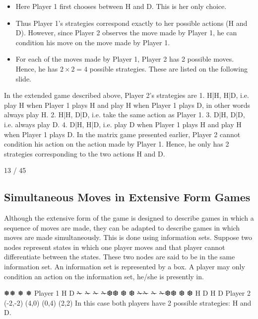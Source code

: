 \documentclass[]{report}
\begin{document}
\begin{itemize}
	\item Here Player 1 first chooses between H and D. This is her only
	choice. 
	\item Thus Player 1’s strategies correspond exactly to her
	possible actions (H and D).
	However, since Player 2 observes the move made by Player 1, he
	can condition his move on the move made by Player 1.
	\item For each of the moves made by Player 1, Player 2 has 2 possible
	moves. Hence, he has $2 \times 2 = 4$ possible strategies. These are
	listed on the following slide.
\end{itemize}


In the extended game described above, Player 2’s strategies are
1. H|H, H|D, i.e. play H when Player 1 plays H and
play H when Player 1 plays D, in other words always
play H.
2. H|H, D|D, i.e. take the same action as Player 1.
3. D|H, D|D, i.e. always play D.
4. D|H, H|D, i.e. play D when Player 1 plays H and
play H when Player 1 plays D.
In the matrix game presented earlier, Player 2 cannot condition his
action on the action made by Player 1. Hence, he only has 2
strategies corresponding to the two actions H and D.

13 / 45
\subsection{Simultaneous Moves in Extensive Form Games}
Although the extensive form of the game is designed to describe
games in which a sequence of moves are made, they can be
adapted to describe games in which moves are made
simultaneously.
This is done using information sets. Suppose two nodes represent
states in which one player moves and that player cannot
differentiate between the states.
These two nodes are said to be in the same information set. An
information set is represented by a box.
A player may only condition an action on the information set,
he/she is presently in.




❅❅
❅
❅
Player 1
H D
✁
✁
✁
✁❆❆
❆
❆ ✁✁
✁
✁❆❆
❆
❆
H D H D
Player 2
(-2,-2) (4,0) (0,4) (2,2)
In this case both players have 2 possible strategies: H and D.
\end{document}

